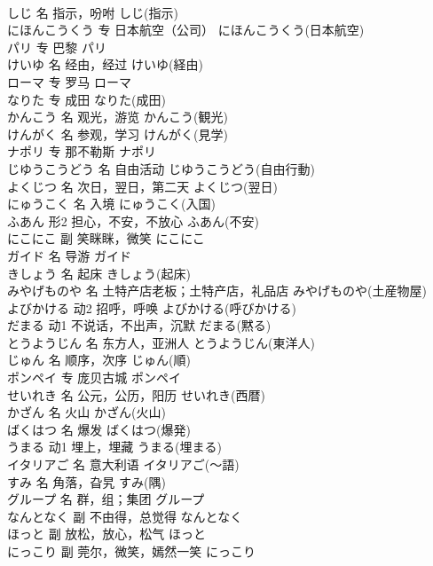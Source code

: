 \documentclass[8pt]{extreport}
\begin{document}
\begin{CJK}{UTF8}{min}
\\	しじ	名	指示，吩咐	しじ(指示)	
\\	にほんこうくう	专	日本航空（公司）	にほんこうくう(日本航空)	
\\	パリ	专	巴黎	パリ	
\\	けいゆ	名	经由，经过	けいゆ(経由)	
\\	ローマ	专	罗马	ローマ	
\\	なりた	专	成田	なりた(成田)	
\\	かんこう	名	观光，游览	かんこう(観光)	
\\	けんがく	名	参观，学习	けんがく(見学)	
\\	ナポリ	专	那不勒斯	ナポリ	
\\	じゆうこうどう	名	自由活动	じゆうこうどう(自由行動)	
\\	よくじつ	名	次日，翌日，第二天	よくじつ(翌日)	
\\	にゅうこく	名	入境	にゅうこく(入国)	
\\	ふあん	形2	担心，不安，不放心	ふあん(不安)	
\\	にこにこ	副	笑眯眯，微笑	にこにこ	
\\	ガイド	名	导游	ガイド	
\\	きしょう	名	起床	きしょう(起床)	
\\	みやげものや	名	土特产店老板；土特产店，礼品店	みやげものや(土産物屋)	
\\	よびかける	动2	招呼，呼唤	よびかける(呼びかける)	
\\	だまる	动1	不说话，不出声，沉默	だまる(黙る)	
\\	とうようじん	名	东方人，亚洲人	とうようじん(東洋人)	
\\	じゅん	名	顺序，次序	じゅん(順)	
\\	ポンペイ	专	庞贝古城	ポンペイ	
\\	せいれき	名	公元，公历，阳历	せいれき(西暦)	
\\	かざん	名	火山	かざん(火山)	
\\	ばくはつ	名	爆发	ばくはつ(爆発)	
\\	うまる	动1	埋上，埋藏	うまる(埋まる)	
\\	イタリアご	名	意大利语	イタリアご(～語)	
\\	すみ	名	角落，旮旯	すみ(隅)	
\\	グループ	名	群，组；集团	グループ	
\\	なんとなく	副	不由得，总觉得	なんとなく	
\\	ほっと	副	放松，放心，松气	ほっと	
\\	にっこり	副	莞尔，微笑，嫣然一笑	にっこり	

\end{CJK}
\end{document}
